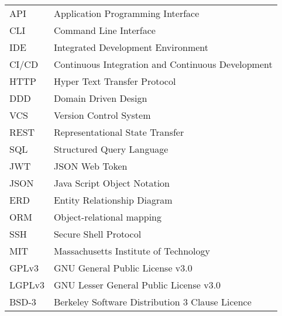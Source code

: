\begin{longtable}{p{3cm}p{10cm}}
    API&Application Programming Interface\\
    CLI&Command Line Interface\\
    IDE&Integrated Development Environment\\
    CI/CD&Continuous Integration and Continuous Development\\
    HTTP&Hyper Text Transfer Protocol\\
    DDD&Domain Driven Design\\
    VCS&Version Control System\\
    REST&Representational State Transfer\\
    SQL&Structured Query Language\\
    JWT&JSON Web Token\\
    JSON&Java Script Object Notation\\
    ERD&Entity Relationship Diagram\\
    ORM&Object-relational mapping\\
    SSH&Secure Shell Protocol\\
    MIT&Massachusetts Institute of Technology\\
    GPLv3&GNU General Public License v3.0\\
    LGPLv3&GNU Lesser General Public License v3.0\\
    BSD-3&Berkeley Software Distribution 3 Clause Licence\\
\end{longtable}
\addtocounter{table}{-1}
